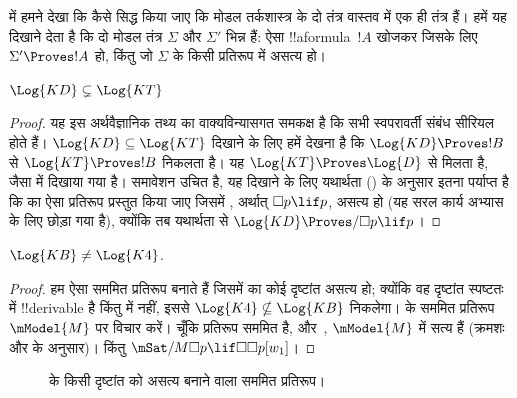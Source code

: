 \documentclass[../../../include/open-logic-section]{subfiles}
\begin{document}


 में हमने देखा कि कैसे सिद्ध किया जाए कि मोडल तर्कशास्त्र के
दो तंत्र वास्तव में एक ही तंत्र हैं।  हमें यह
दिखाने देता है कि दो मोडल तंत्र $\Sigma$ और $\Sigma'$ भिन्न हैं: ऐसा
!!a{formula}~$!A$ खोजकर जिसके लिए $\Sigma' \Proves !A$ हो, किंतु जो
$\Sigma$ के किसी प्रतिरूप में असत्य हो।

\begin{prop}
  $\Log{KD} \subsetneq \Log{KT}$
\end{prop}

\begin{proof} यह इस अर्थवैज्ञानिक तथ्य का वाक्यविन्यासगत समकक्ष है कि सभी
  स्वपरावर्ती संबंध सीरियल होते हैं। $\Log{KD} \subseteq \Log{KT}$ दिखाने
  के लिए हमें देखना है कि $\Log{KD} \Proves !B$ से $\Log{KT} \Proves !B$
  निकलता है। यह $\Log{KT} \Proves \Log{D}$ से मिलता है, जैसा
   में दिखाया गया
  है। समावेशन उचित है, यह दिखाने के लिए यथार्थता
  () के अनुसार इतना पर्याप्त है कि  का
  ऐसा प्रतिरूप प्रस्तुत किया जाए जिसमें , अर्थात् $\Box p \lif p$,
  असत्य हो (यह सरल कार्य अभ्यास के लिए छोड़ा गया है), क्योंकि तब यथार्थता
  से $\Log{KD} \Proves/ \Box p \lif p$।
\end{proof}

\begin{prop}
  $\Log{KB} \neq \Log{K4}$. 
\end{prop}

\begin{proof}
  हम ऐसा सममित प्रतिरूप बनाते हैं जिसमें  का कोई दृष्टांत असत्य हो;
  क्योंकि वह दृष्टांत स्पष्टतः  में !!{derivable} है किंतु
   में नहीं, इससे $\Log{K4} \nsubseteq \Log{KB}$ निकलेगा।
   के सममित प्रतिरूप $\mModel{M}$ पर विचार करें। चूँकि
  प्रतिरूप सममित है,  और~, $\mModel{M}$ में सत्य हैं (क्रमशः
   और
   के अनुसार)। किंतु
  $\mSat/{M}{\Box p \lif \Box\Box p}[w_1]$।
\end{proof}

\begin{figure}[htpb]
  \centering
  \caption{ के किसी दृष्टांत को असत्य बनाने वाला सममित प्रतिरूप।}
\end{figure}
 
\end{document}
